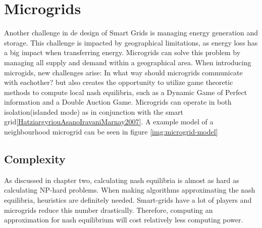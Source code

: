 
\section{Microgrids}\label{microgrids}


Another challenge in de design of Smart Grids is managing energy generation and storage. This challenge is impacted by geographical limitations, as energy loss has a big  impact when transferring energy.\cite{EnergyLossURL}
Microgrids can solve this problem by managing all supply and demand within a geographical area. When introducing microgids, new challenges arise: In what way should microgrids communicate with eachother? but also creates the opportunity to utilize game theoretic methods to compute local nash equilibria, such as a Dynamic Game of Perfect information and a Double Auction Game.
Microgrids can operate in both isolation(islanded mode) as in conjunction with the smart grid\ref{HatziargyriouAsanoIravaniMarnay2007}. 
A example model of a neighbourhood microgrid can be seen in figure \ref{img:microgrid-model}





\subsection{Complexity}

As discussed in chapter two, calculating nash equilibria is almost as hard as calculating NP-hard problems. When making algorithms approximating the nash equilibria, heuristics are definitely needed. Smart-grids have a lot of players and microgrids reduce this number drastically. Therefore, computing an approximation for nash equilibrium will cost relatively less computing power.


